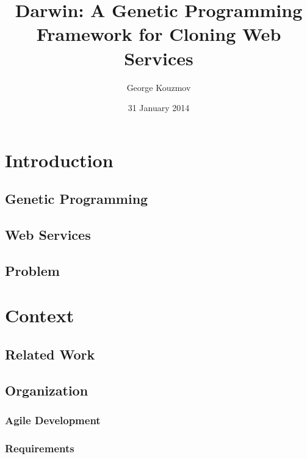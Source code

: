 \documentclass{l4proj}
\begin{document}
\title{Darwin: A Genetic Programming Framework for Cloning Web Services}
\author{George Kouzmov}
\date{31 January 2014}
\maketitle

\tableofcontents
\listoffigures
\listoftables
\chapter{Introduction}


\section{Genetic Programming}


\section{Web Services}


\section{Problem}


\chapter{Context}

\section{Related Work}


\section{Organization}


\subsection{Agile Development}


\subsection{Requirements}

\end{document}

